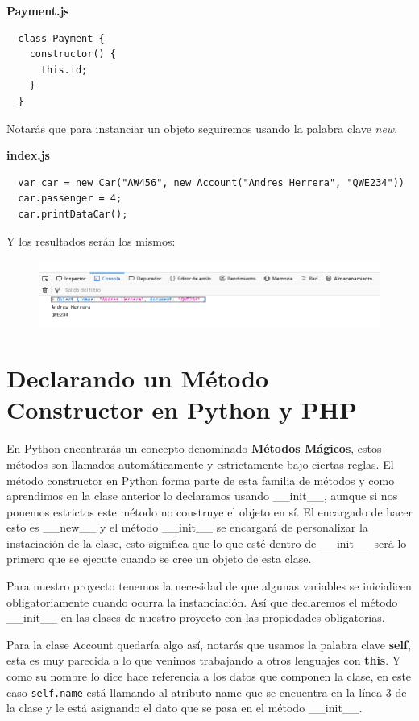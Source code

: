 \documentclass{article}
\begin{document}
\textbf{Payment.js}
\begin{verbatim}
  class Payment {
    constructor() {
      this.id;
    }
  }
\end{verbatim}

Notarás que para instanciar un objeto seguiremos usando la palabra clave \textit{new}.

\textbf{index.js}
\begin{verbatim}
  var car = new Car("AW456", new Account("Andres Herrera", "QWE234"))
  car.passenger = 4;
  car.printDataCar();
\end{verbatim}

Y los resultados serán los mismos:

\begin{figure}[h!]
  \centering
  \includegraphics[scale=0.75]{./Pictures/017_objetos_js.png}
\end{figure}

\section{Declarando un Método Constructor en Python y PHP}%
En Python encontrarás un concepto denominado \textbf{Métodos Mágicos}, estos
métodos son llamados automáticamente y estrictamente bajo ciertas reglas. El
método constructor en Python forma parte de esta familia de métodos y como
aprendimos en la clase anterior lo declaramos usando {\_}{\_}init{\_}{\_},
aunque si nos ponemos estrictos este método no construye el objeto en sí. El
encargado de hacer esto es {\_}{\_}new{\_}{\_} y el método {\_}{\_}init{\_}{\_}
se encargará de personalizar la instaciación de la clase, esto significa que lo
que esté dentro de {\_}{\_}init{\_}{\_} será lo primero que se ejecute cuando
se cree un objeto de esta clase.

Para nuestro proyecto tenemos la necesidad de que algunas variables se
inicialicen obligatoriamente cuando ocurra la instanciación. Así que declaremos
el método {\_}{\_}init{\_}{\_} en las clases de nuestro proyecto con las
propiedades obligatorias.

Para la clase Account quedaría algo así, notarás que usamos la palabra clave
\textbf{self}, esta es muy parecida a lo que venimos trabajando a otros
lenguajes con \textbf{this}. Y como su nombre lo dice hace referencia a los
datos que componen la clase, en este caso \texttt{self.name} está llamando al
atributo name que se encuentra en la línea 3 de la clase y le está asignando el
dato que se pasa en el método {\_}{\_}init{\_}{\_}.\\
\end{document}
